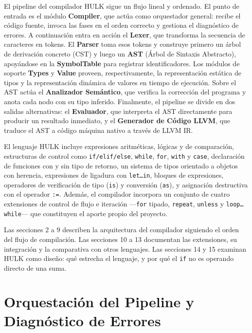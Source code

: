 \documentclass[11pt,a4paper]{article}
\begin{document}
El pipeline del compilador HULK sigue un flujo lineal y ordenado. El punto de entrada es el módulo \textbf{Compiler}, que actúa como orquestador general: recibe el código fuente, invoca las fases en el orden correcto y gestiona el diagnóstico de errores. A continuación entra en acción el \textbf{Lexer}, que transforma la secuencia de caracteres en tokens. El \textbf{Parser} toma esos tokens y construye primero un árbol de derivación concreto (CST) y luego un \textbf{AST} (Árbol de Sintaxis Abstracto), apoyándose en la \textbf{SymbolTable} para registrar identificadores. Los módulos de soporte \textbf{Types} y \textbf{Value} proveen, respectivamente, la representación estática de tipos y la representación dinámica de valores en tiempo de ejecución. Sobre el AST actúa el \textbf{Analizador Semántico}, que verifica la corrección del programa y anota cada nodo con su tipo inferido. Finalmente, el pipeline se divide en dos salidas alternativas: el \textbf{Evaluador}, que interpreta el AST directamente para producir un resultado inmediato, y el \textbf{Generador de Código LLVM}, que traduce el AST a código máquina nativo a través de LLVM IR.

El lenguaje HULK incluye expresiones aritméticas, lógicas y de comparación, estructuras de control como \texttt{if/elif/else}, \texttt{while}, \texttt{for}, \texttt{with} y \texttt{case}, declaración de funciones con y sin tipo de retorno, un sistema de tipos orientado a objetos con herencia, expresiones de ligadura con \texttt{let\ldots in}, bloques de expresiones, operadores de verificación de tipo (\texttt{is}) y conversión (\texttt{as}), y asignación destructiva con el operador \texttt{:=}. Además, el compilador incorpora un conjunto de cuatro extensiones de control de flujo e iteración ---\texttt{for} tipado, \texttt{repeat}, \texttt{unless} y \texttt{loop\ldots while}--- que constituyen el aporte propio del proyecto.

Las secciones 2 a 9 describen la arquitectura del compilador siguiendo el orden del flujo de compilación. Las secciones 10 a 13 documentan las extensiones, su integración y la comparativa con otros lenguajes. Las secciones 14 y 15 examinan HULK como diseño: qué estrecha el lenguaje, y por qué el \texttt{if} no es operando directo de una suma.

\section{Orquestación del Pipeline y Diagnóstico de Errores}
\end{document}
